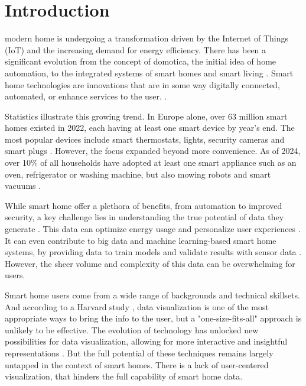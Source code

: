 \documentclass[journal]{IEEEtran}
\begin{document}
\section{Introduction}
 modern home is undergoing a transformation driven by the Internet of Things (IoT) and the increasing demand for energy efficiency. There has been a significant evolution from the concept of domotica, the initial idea of home automation, to the integrated systems of smart homes and smart living \cite{Solaimani2015WhatLiterature}. Smart home technologies are innovations that are in some way digitally connected, automated, or enhance services to the user. \cite{Urwin2023WhatIn, NarsunStudios2023UsingFuture, Sovacool2020SmartPolicies}.

Statistics illustrate this growing trend. In Europe alone, over 63 million smart homes existed in 2022, each having at least one smart device by year's end. The most popular devices include smart thermostats, lights, security cameras and smart plugs \cite{The2022}. However, the focus expanded beyond more convenience. As of 2024, over 10\% of all households have adopted at least one smart appliance such as an oven, refrigerator or washing machine, but also mowing robots and smart vacuums \cite{2024SmartForecast}. 

While smart home offer a plethora of benefits, from automation to improved security, a key challenge lies in understanding the true potential of data they generate \cite{NarsunStudios2023UsingFuture}. This data can optimize energy usage \cite{Al-Ali2017AApproach} and personalize user experiences \cite{Matsui2018AnSensors}. It can even contribute to big data and machine learning-based smart home systems, by providing data to train models and validate results with sensor data \cite{Machorro-Cano2020HEMS-IoT:Saving}.  However, the sheer volume and complexity of this data can be overwhelming for users.

Smart home users come from a wide range of backgrounds and technical skillsets.  And according to a Harvard study \cite{Unwin2020WhyVisualization},  data visualization is one of the most appropriate ways to bring the info to the user, but a "one-size-fits-all" approach is unlikely to be effective. The evolution of technology has unlocked new possibilities for data visualization, allowing for more interactive and insightful representations \cite{Unwin2020WhyVisualization}. But the full potential of these techniques remains largely untapped in the context of smart homes. There is a lack of user-centered visualization, that hinders the full capability of smart home data.
\end{document}
